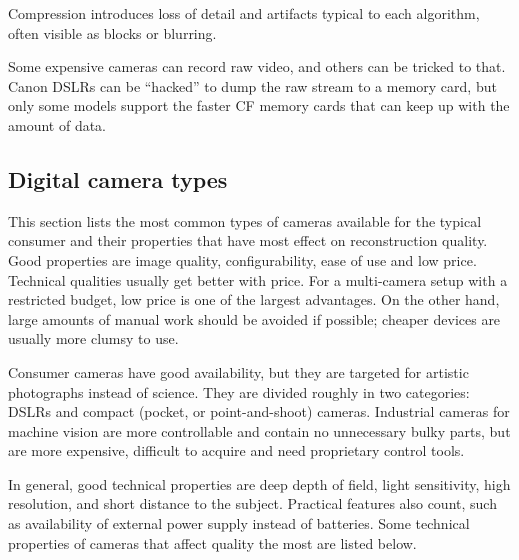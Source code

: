 Compression introduces loss of detail and artifacts typical to each algorithm, often visible as blocks or blurring.

Some expensive cameras can record raw video, and others can be tricked to that.
Canon DSLRs can be ``hacked'' to dump the raw stream to a memory card, but only some models support the faster CF memory cards that can keep up with the amount of data.


\subsection{Digital camera types} \label{sec:cameratypes} %


This section lists the most common types of cameras available for the typical consumer and their properties that have most effect on reconstruction quality.
Good properties are image quality, configurability, ease of use and low price.
Technical qualities usually get better with price.
For a multi-camera setup with a restricted budget, low price is one of the largest advantages.
On the other hand, large amounts of manual work should be avoided if possible; cheaper devices are usually more clumsy to use.


Consumer cameras have good availability, but they are targeted for artistic photographs instead of science.
They are divided roughly in two categories: DSLRs and compact (pocket, or point-and-shoot) cameras.
Industrial cameras for machine vision are more controllable and contain no unnecessary bulky parts, but are more expensive, difficult to acquire and need proprietary control tools.

In general, good technical properties are deep depth of field, light sensitivity, high resolution, and short distance to the subject.
Practical features also count, such as availability of external power supply instead of batteries.
Some technical properties of cameras that affect quality the most are listed below.

